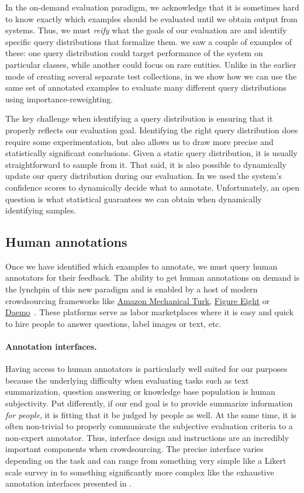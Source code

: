 In the on-demand evaluation paradigm, 
  we acknowledge that it is sometimes hard to know exactly which examples should be evaluated until we obtain output from systems.
Thus, we must \textit{reify} what the goals of our evaluation are and identify specific query distributions that formalize them.
 we saw a couple of examples of these: one query distribution could target performance of the system on particular classes, while another could focus on rare entities.
Unlike in the earlier mode of creating several separate test collections, in  we show how we can use the same set of annotated examples to evaluate many different query distributions using importance-reweighting.

The key challenge when identifying a query distribution is ensuring that it properly reflects our evaluation goal.
Identifying the right query distribution does require some experimentation, but also allows us to draw more precise and statistically significant conclusions.
Given a static query distribution, it is usually straightforward to sample from it.
That said, it is also possible to dynamically update our query distribution during our evaluation.
In  we used the system's confidence scores to dynamically decide what to annotate.
Unfortunately, an open question is what statistical guarantees we can obtain when dynamically identifying samples.

\subsection{Human annotations}
Once we have identified which examples to annotate, we must query human annotators for their feedback.
The ability to get human annotations on demand is the lynchpin of this new paradigm and is enabled by a host of modern crowdsourcing frameworks like \href{requester.mturk.com}{Amazon Mechanical Turk}, \href{https://www.figure-eight.com/}{Figure Eight} or \href{https://daemo.org}{Daemo}~\cite{gaikwad2015daemo}.
These platforms serve as labor marketplaces where it is easy and quick to hire people to answer questions, label images or text, etc.

\paragraph{Annotation interfaces.}
Having access to human annotators is particularly well suited for our purposes because the underlying difficulty when evaluating tasks such as text summarization, question answering or knowledge base population is human subjectivity.
Put differently, if our end goal is to provide summarize information \textit{for people}, it is fitting that it be judged by people as well.
At the same time, it is often non-trivial to properly communicate the subjective evaluation criteria to a non-expert annotator.
Thus, interface design and instructions are an incredibly important components when crowdsourcing.
The precise interface varies depending on the task and can range from something very simple like a Likert scale survey in  to something significantly more complex like the exhaustive annotation interfaces presented in .

